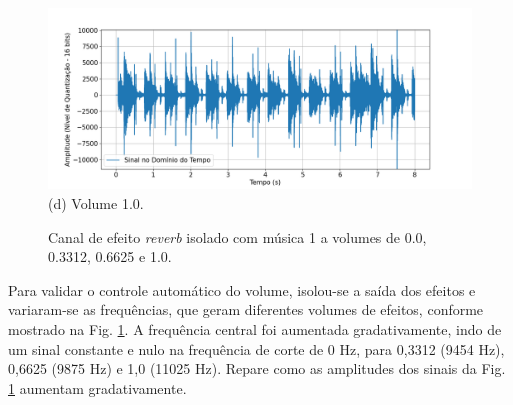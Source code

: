\begin{figure}[htpb]
    \begin{minipage}[b]{0.7\textwidth}
        \centering
        \includegraphics[width=\textwidth]{figuras/fig69.png}
        \vspace{0.3cm} %
        (d) Volume 1.0.
    \end{minipage}

    \caption{Canal de efeito \textit{reverb} isolado com música 1 a volumes de 0.0, 0.3312, 0.6625 e 1.0.}
    \label{fig66}
\end{figure}


Para validar o controle automático do volume, isolou-se a saída dos efeitos e variaram-se as frequências, que geram diferentes volumes de efeitos, %
conforme mostrado na Fig. \ref{fig66}.
A frequência central foi aumentada gradativamente, indo de um sinal constante e nulo na frequência de corte de 0 Hz, para 0,3312 (9454 Hz), 0,6625 (9875 Hz) e 1,0 (11025 Hz). Repare como as amplitudes dos sinais da Fig. \ref{fig66} aumentam gradativamente.






